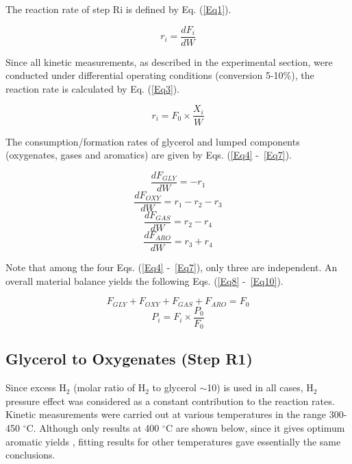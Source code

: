 \documentclass[journal=iecred,manuscript=article]{achemso}
\begin{document}
The reaction rate of step Ri is defined by Eq. (\ref{Eq1}).

\begin{equation} \label{Eq1}
r_i=\frac{dF_i}{dW}
\end{equation}


Since all kinetic measurements, as described in the experimental section,
were conducted under differential operating conditions (conversion 5-10\%),
the reaction rate is calculated by Eq. (\ref{Eq3}).

\begin{equation} \label{Eq3}
r_i=F_{0} \times \frac{X_i}{W}
\end{equation}

The consumption/formation rates of glycerol and lumped components (oxygenates, gases and aromatics) are given by Eqs. (\ref{Eq4} -~\ref{Eq7}).

\begin{equation} \label{Eq4}
\frac{dF_{GLY}}{dW}=-r_1
\end{equation}
\begin{equation} \label{Eq5}
\frac{dF_{OXY}}{dW}=r_1-r_2-r_3
\end{equation}
\begin{equation} \label{Eq6}
\frac{dF_{GAS}}{dW}=r_2-r_4
\end{equation}
\begin{equation} \label{Eq7}
\frac{dF_{ARO}}{dW}=r_3+r_4
\end{equation}

Note that among the four Eqs. (\ref{Eq4} -~\ref{Eq7}), only three are independent.
An overall material balance yields the following Eqs. (\ref{Eq8} -~\ref{Eq10}).

\begin{equation} \label{Eq8}
F_{GLY}+F_{OXY}+F_{GAS}+F_{ARO}=F_{0}
\end{equation}
\begin{equation} \label{Eq10}
P_{i}=F_{i} \times \frac{P_{0}}{F_{0}}
\end{equation}


\subsection{Glycerol to Oxygenates (Step R1)}

Since excess H$_2$ (molar ratio of H$_2$ to glycerol $\sim$10) is used in all cases,
H$_2$ pressure effect was considered as a constant contribution to the reaction rates.
Kinetic measurements were carried out at various temperatures in the range 300-450 $^{\circ}$C.
Although only results at 400 $^{\circ}$C are shown below, since it gives optimum aromatic yields \cite{Xiao2016},
fitting results for other temperatures gave essentially the same conclusions.
\end{document}

